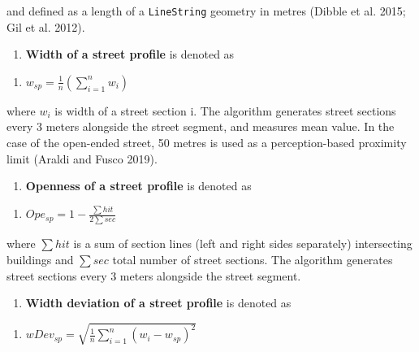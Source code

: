 \documentclass[
  letterpaper,
  DIV=11,
  numbers=noendperiod]{scrartcl}
\providecommand{\tightlist}{%
  \setlength{\itemsep}{0pt}\setlength{\parskip}{0pt}}\usepackage{longtable,booktabs,array}
\begin{document}
and defined as a length of a \texttt{LineString} geometry in metres
(Dibble et al. 2015; Gil et al. 2012).

\begin{enumerate}
\def\labelenumi{\arabic{enumi}.}
\setcounter{enumi}{17}
\tightlist
\item
  \textbf{Width of a street profile} is denoted as
\end{enumerate}

\begin{enumerate}
\def\labelenumi{(\arabic{enumi})}
\setcounter{enumi}{17}
\tightlist
\item
  \(w_{sp} = \frac{1}{n}\left(\sum_{i=1}^{n} w_{i}\right)\)
\end{enumerate}

where \(w_{i}\) is width of a street section i. The algorithm generates
street sections every 3 meters alongside the street segment, and
measures mean value. In the case of the open-ended street, 50 metres is
used as a perception-based proximity limit (Araldi and Fusco 2019).

\begin{enumerate}
\def\labelenumi{\arabic{enumi}.}
\setcounter{enumi}{18}
\tightlist
\item
  \textbf{Openness of a street profile} is denoted as
\end{enumerate}

\begin{enumerate}
\def\labelenumi{(\arabic{enumi})}
\setcounter{enumi}{18}
\tightlist
\item
  \(Ope_{sp} = 1 - \frac{\sum hit}{2\sum sec}\)
\end{enumerate}

where \(\sum hit\) is a sum of section lines (left and right sides
separately) intersecting buildings and \(\sum sec\) total number of
street sections. The algorithm generates street sections every 3 meters
alongside the street segment.

\begin{enumerate}
\def\labelenumi{\arabic{enumi}.}
\setcounter{enumi}{19}
\tightlist
\item
  \textbf{Width deviation of a street profile} is denoted as
\end{enumerate}

\begin{enumerate}
\def\labelenumi{(\arabic{enumi})}
\setcounter{enumi}{19}
\tightlist
\item
  \(wDev_{sp} = \sqrt{\frac{1}{n} \sum_{i=1}^{n}\left(w_{i}-w_{sp}\right)^{2}}\)
\end{enumerate}
\end{document}
